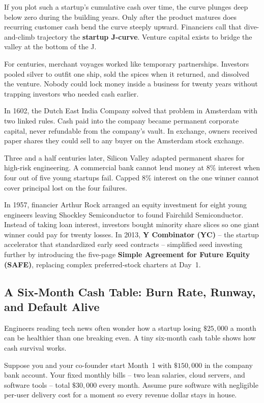 If you plot such a startup's cumulative cash over time, the curve plunges deep below zero during the building years. Only after the product matures does recurring customer cash bend the curve steeply upward. Financiers call that dive-and-climb trajectory the \textbf{startup J-curve}. Venture capital exists to bridge the valley at the bottom of the J.

\begin{historybox}
For centuries, merchant voyages worked like temporary partnerships. Investors pooled silver to outfit one ship, sold the spices when it returned, and dissolved the venture. Nobody could lock money inside a business for twenty years without trapping investors who needed cash earlier.

In 1602, the Dutch East India Company solved that problem in Amsterdam with two linked rules. Cash paid into the company became permanent corporate capital, never refundable from the company's vault. In exchange, owners received paper shares they could sell to any buyer on the Amsterdam stock exchange.

Three and a half centuries later, Silicon Valley adapted permanent shares for high-risk engineering. A commercial bank cannot lend money at $8\%$ interest when four out of five young startups fail. Capped $8\%$ interest on the one winner cannot cover principal lost on the four failures.

In 1957, financier Arthur Rock arranged an equity investment for eight young engineers leaving Shockley Semiconductor to found Fairchild Semiconductor. Instead of taking loan interest, investors bought minority share slices so one giant winner could pay for twenty losses. In 2013, \textbf{Y Combinator (YC)} -- the startup accelerator that standardized early seed contracts -- simplified seed investing further by introducing the five-page \textbf{Simple Agreement for Future Equity (SAFE)}, replacing complex preferred-stock charters at Day~1.
\end{historybox}

\subsection{A Six-Month Cash Table: Burn Rate, Runway, and Default Alive}

Engineers reading tech news often wonder how a startup losing $\$25{,}000$ a month can be healthier than one breaking even. A tiny six-month cash table shows how cash survival works.

Suppose you and your co-founder start Month~1 with $\$150{,}000$ in the company bank account. Your fixed monthly bills -- two lean salaries, cloud servers, and software tools -- total $\$30{,}000$ every month. Assume pure software with negligible per-user delivery cost for a moment so every revenue dollar stays in house.

